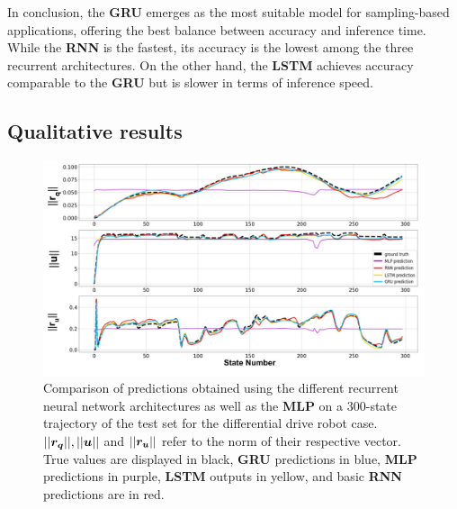 In conclusion, the \textbf{GRU} emerges as the most suitable model for sampling-based applications, offering the best balance between accuracy and inference time. 
While the \textbf{RNN} is the fastest, its accuracy is the lowest among the three recurrent architectures. 
On the other hand, the \textbf{LSTM} achieves accuracy comparable to the \textbf{GRU} but is slower in terms of inference speed.



\subsection{Qualitative results}

\begin{figure}[htp]
    \centering
    \includegraphics[width=0.99\linewidth]{figures/learning_unic/all_models_labeled.jpg} 
    \caption{Comparison of predictions obtained using the different recurrent neural network architectures as well as the \textbf{MLP} on a 300-state trajectory of the test set for the differential drive robot case. 
    $||\boldsymbol{r_q}||, ||\boldsymbol{u}||$ and $||\boldsymbol{r_u}||$ refer to the norm of their respective vector. 
    True values are displayed in black, \textbf{GRU} predictions in blue, \textbf{MLP} predictions in purple, \textbf{LSTM} outputs in yellow, and basic \textbf{RNN} predictions are in red.}
    \label{fig:all_models_pred_val_unic}
\end{figure}

